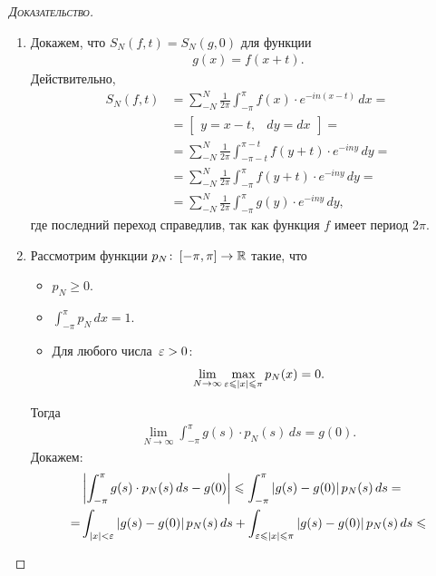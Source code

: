 \documentclass[../complex-analysis.tex]{subfiles}
\begin{document}
\begin{proof}[\normalfont\textsc{Доказательство}]\
 \begin{enumerate}
  \item \label{enum1:Feyer Thm} Докажем, что $ S_N(f,t) = S_N(g, 0) $ для функции
   \begin{align*}
    g(x) = f(x + t).
   \end{align*} Действительно,
   \begin{align*}
    S_N(f,t) &= \sum_{-N}^{N} \frac{1}{2\pi} \int_{-\pi}^{\pi} f(x)\cdot e^{-in(x-t)}\,dx =  \\
    &= \begin{bmatrix}
     y = x - t, & dy = dx
    \end{bmatrix} = \\
    &= \sum_{-N}^{N} \frac{1}{2\pi} \int_{-\pi - t}^{\pi - t} f(y + t) \cdot e^{-iny}\,dy = \\
    &= \sum_{-N}^{N}\frac{1}{2\pi} \int_{-\pi}^{\pi} f(y+t) \cdot e^{-iny}\,dy = \\
    &= \sum_{-N}^{N} \frac{1}{2\pi} \int_{-\pi}^{\pi} g(y) \cdot e^{-iny}\,dy,
   \end{align*} где последний переход справедлив, так как функция $f$ имеет период $2 \pi$.  
  \item \label{enum2:Feyer Thm} Рассмотрим функции $ p_N \colon\, [-\pi,\pi] \to \mathbb{R} $ такие, что
   \begin{itemize}
    \item $ p_N \geqslant 0 $.
    \item $ \int_{-\pi}^{\pi} p_N\,dx = 1  $.
    \item Для любого числа~$ \varepsilon > 0 $:
     \begin{align}
      \label{eq:enum2 Property 3:Feyer Thm}
      \lim_{N \to \infty} \max_{ \varepsilon \leqslant \left| x \right| \leqslant \pi } p_N(x) = 0.
     \end{align}
   \end{itemize} Тогда 
   \begin{align}
    \label{eq:Lim Dot Product with p_N:Feyer Thm}
    \lim_{N \to \infty} \int_{-\pi}^{\pi} g(s) \cdot p_N(s)\,ds = g(0).
   \end{align} Докажем:
   \begin{align*}
    &\left|\int_{-\pi}^{\pi} g(s) \cdot p_N(s)\,ds - g(0) \right| \leqslant \int_{-\pi}^{\pi} \left| g(s) - g(0) \right|p_N(s)\,ds = \\
    = &\int_{\left| x \right| < \eps} \left| g(s)-g(0) \right|p_N(s)\,ds  + \int_{\eps \leqslant \left| x \right| \leqslant \pi} \left| g(s)-g(0) \right|p_N(s)\,ds \leqslant \\

\end{align*}
\end{enumerate}
\end{proof}
\end{document}
